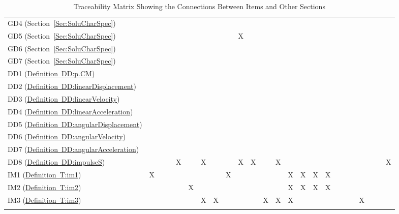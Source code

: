 \documentclass[12pt]{article}
\begin{document}
\begin{longtable}{l l l l l l l l l l l l l l l l l l l l l l l l}
\\
GD4 (Section~\ref{Sec:SoluCharSpec}) &  &  &  &  &  &  &  &  &  &  &  &  &  &  &  &  &  &  &  &  &  &  & 
\\
GD5 (Section~\ref{Sec:SoluCharSpec}) &  &  &  &  &  &  &  &  & X &  &  &  &  &  &  &  &  &  &  &  &  &  & 
\\
GD6 (Section~\ref{Sec:SoluCharSpec}) &  &  &  &  &  &  &  &  &  &  &  &  &  &  &  &  &  &  &  &  &  &  & 
\\
GD7 (Section~\ref{Sec:SoluCharSpec}) &  &  &  &  &  &  &  &  &  &  &  &  &  &  &  &  &  &  &  &  &  &  & 
\\
DD1 (\hyperref[DD:p.CM]{Definition~DD:p.CM}) &  &  &  &  &  &  &  &  &  &  &  &  &  &  &  &  &  &  &  &  &  &  & 
\\
DD2 (\hyperref[DD:linearDisplacement]{Definition~DD:linearDisplacement}) &  &  &  &  &  &  &  &  &  &  &  &  &  &  &  &  &  &  &  &  &  &  & 
\\
DD3 (\hyperref[DD:linearVelocity]{Definition~DD:linearVelocity}) &  &  &  &  &  &  &  &  &  &  &  &  &  &  &  &  &  &  &  &  &  &  & 
\\
DD4 (\hyperref[DD:linearAcceleration]{Definition~DD:linearAcceleration}) &  &  &  &  &  &  &  &  &  &  &  &  &  &  &  &  &  &  &  &  &  &  & 
\\
DD5 (\hyperref[DD:angularDisplacement]{Definition~DD:angularDisplacement}) &  &  &  &  &  &  &  &  &  &  &  &  &  &  &  &  &  &  &  &  &  &  & 
\\
DD6 (\hyperref[DD:angularVelocity]{Definition~DD:angularVelocity}) &  &  &  &  &  &  &  &  &  &  &  &  &  &  &  &  &  &  &  &  &  &  & 
\\
DD7 (\hyperref[DD:angularAcceleration]{Definition~DD:angularAcceleration}) &  &  &  &  &  &  &  &  &  &  &  &  &  &  &  &  &  &  &  &  &  &  & 
\\
DD8 (\hyperref[DD:impulseS]{Definition~DD:impulseS}) &  &  &  & X &  & X &  &  & X & X &  & X &  &  &  &  &  &  &  &  &  &  & X
\\
IM1 (\hyperref[T:im1]{Definition~T:im1}) & X &  &  &  &  &  &  & X &  &  &  &  & X & X & X & X &  &  &  &  &  &  & 
\\
IM2 (\hyperref[T:im2]{Definition~T:im2}) &  &  &  &  & X &  &  &  &  &  &  &  & X & X & X & X &  &  &  &  &  &  & 
\\
IM3 (\hyperref[T:im3]{Definition~T:im3}) &  &  &  &  &  & X & X &  &  &  & X & X & X &  &  &  &  &  &  & X &  &  & 
\\
\bottomrule
\caption{Traceability Matrix Showing the Connections Between Items and Other Sections}
\label{Table:TracMatrShowtheConnBetwItemandOtheSect}
\end{longtable}
\end{document}
